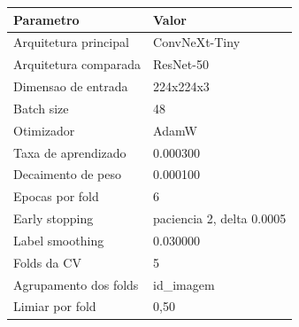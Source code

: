 \begin{tabular}{ll}
\toprule
Parametro & Valor \\
\midrule
Arquitetura principal & ConvNeXt-Tiny \\
Arquitetura comparada & ResNet-50 \\
Dimensao de entrada & 224x224x3 \\
Batch size & 48 \\
Otimizador & AdamW \\
Taxa de aprendizado & 0.000300 \\
Decaimento de peso & 0.000100 \\
Epocas por fold & 6 \\
Early stopping & paciencia 2, delta 0.0005 \\
Label smoothing & 0.030000 \\
Folds da CV & 5 \\
Agrupamento dos folds & id_imagem \\
Limiar por fold & 0,50 \\
\bottomrule
\end{tabular}

